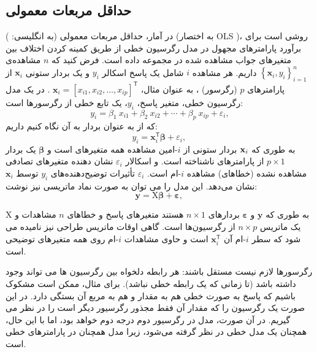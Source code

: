 \documentclass[12pt,a4paper,BCOR=.7cm,headsepline,bibliography=totoc]{report}
\begin{document}
\subsection{حداقل مربعات معمولی}
در آمار، حداقل مربعات معمولی (به انگلیسی: ) (به اختصار OLS )، روشی است برای برآورد پارامترهای مجهول در مدل رگرسیون خطی از طریق کمینه کردن اختلاف بین متغیرهای جواب مشاهده شده در مجموعه داده است. فرض کنید که $n$ مشاهده‌ی
 $\left\{\mathbf {x} _{i},y_{i}\right\}_{i=1}^{n}$
 داریم.
هر مشاهده $i$ شامل یک پاسخ اسکالر $y_{i}$ و یک بردار ستونی $\mathbf {x}_{i}$ از پارامترهای $p$ (رگرسور) ، به عنوان مثال، 
$\mathbf {x}_{i}=\left[x_{i1},x_{i2},\dots ,x_{ip}\right]^{\mathsf { T}}$
. در یک مدل رگرسیون خطی، متغیر پاسخ، $y_{i}$، یک تابع خطی از رگرسورها است:
$${\displaystyle y_{i}=\beta _{1}\ x_{i1}+\beta _{2}\ x_{i2}+\cdots +\beta _{p}\ x_{ip}+\varepsilon _{i},}$$
که از به عنوان بردار به آن نگاه کنیم داریم:
$$
{\displaystyle y_{i}=\mathbf {x} _{i}^{\mathsf {T}}{\boldsymbol {\beta }}+\varepsilon _{i},\,}
$$
به طوری که ${\displaystyle}\mathbf {x} _{i}$ بردار ستونی از
 ${\displaystyle i}$-امین مشاهده همه متغیرهای است و
 ${\displaystyle\boldsymbol {\beta}}$	
 یک بردار ${\displaystyle p\times 1}$ از پارامترهای ناشناخته است. و اسکالار
 ${\displaystyle \varepsilon _{i}}$
 نشان دهنده متغیرهای تصادفی مشاهده نشده (خطاهای) مشاهده 
${\displaystyle i}$-ام است.
${\displaystyle \varepsilon _{i}}$
 تأثیرات توضیح‌دهنده‌های
 ${\displaystyle y_{i}}$ 
توسط
${\displaystyle \mathbf {x} _ {i}}$
نشان می‌دهد.
 این مدل را می توان به صورت نماد ماتریسی نیز نوشت:
$$
{\displaystyle \mathbf {y} =\mathrm {X} {\boldsymbol {\beta }}+{\boldsymbol {\varepsilon }},\,}
$$

به طوری که ${\displaystyle \mathbf {y} }$ و ${\displaystyle {\boldsymbol {\varepsilon}}}$ بردارهای
 ${\displaystyle n\times 1}$ هستند متغیرهای پاسخ و خطاهای ${\displaystyle n}$ مشاهدات و ${\displaystyle \mathrm {X} }$ یک ماتریس ${\displaystyle n\times p}$ از رگرسیون‌ها است. گاهی اوقات ماتریس طراحی نیز نامیده می شود که سطر ${\displaystyle i}$-ام آن $ {\displaystyle \mathbf {x} _{i}^{\mathsf {T}}}$ است و حاوی مشاهدات ${\displaystyle i}$-ام روی همه متغیرهای توضیحی است.

رگرسورها لازم نیست مستقل باشند: هر رابطه دلخواه بین رگرسیون ها می تواند وجود داشته باشد (تا زمانی که یک رابطه خطی نباشد). برای مثال، ممکن است مشکوک باشیم که پاسخ به صورت خطی هم به مقدار و هم به مربع آن بستگی دارد. در این صورت یک رگرسیون را که مقدار آن فقط مجذور رگرسیور دیگر است را در نظر می گیریم. در آن صورت، مدل در رگرسیور دوم درجه دوم خواهد بود، اما با این حال، همچنان یک مدل خطی در نظر گرفته می‌شود، زیرا مدل همچنان در پارامترهای خطی است.
\end{document}
